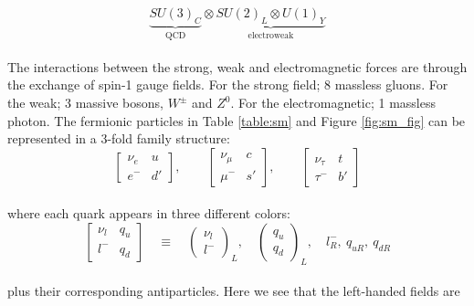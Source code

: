 \begin{equation}\label{eq:2.1} 
    \underbrace{SU(3)_{C}}_\text{QCD} \otimes \underbrace{SU(2)_{L} \otimes U(1)_{Y}}_\text{electroweak}
\tag{2.1}
\end{equation}
\\
The interactions between the strong, weak and electromagnetic forces are through the exchange of spin-1 gauge fields. For the strong field;
8 massless gluons. For the weak; 3 massive bosons, $W^\pm$ and $Z^0$. For the electromagnetic;
1 massless photon. The fermionic particles in Table \ref{table:sm} and Figure \ref{fig:sm_fig} can be represented
in a 3-fold family structure:
\\
\begin{equation}\label{eq:2.2}
  \begin{bmatrix}
    \nu_{e} & \textit{u} \\ 
    e^- & \textit{d}'
  \end{bmatrix}    
  ,
  \qquad
  \begin{bmatrix}
    \nu_{\mu} & \textit{c} \\
    \mu^- & \textit{s}'
  \end{bmatrix}
  ,
  \qquad
  \begin{bmatrix}
    \nu_{\tau} & \textit{t} \\
    \tau^- & \textit{b}'
  \end{bmatrix}
\tag{2.2}
\end{equation}
\\
where each quark appears in three different colors:
\\
\begin{equation}\label{eq:2.3}
    \begin{bmatrix}
        \nu_{\textit{l}} & \textit{q}_{u} \\
        \textit{l}^- & \textit{q}_{d}
    \end{bmatrix}
    \quad
    \equiv
    \quad 
    \begin{pmatrix}
        \nu_{\textit{l}} \\
        \textit{l}^-
    \end{pmatrix}_{L}
    ,
    \quad
    \begin{pmatrix}
        q_{\textit{u}} \\ 
        q_{\textit{d}} 
    \end{pmatrix}_{L}
    ,
    \quad
   l_{R}^-,\ q_{\textit{u}R},\ q_{\textit{d}R}
\tag{2.3}
\end{equation}
\\
plus their corresponding antiparticles. Here we see that the left-handed fields are 
